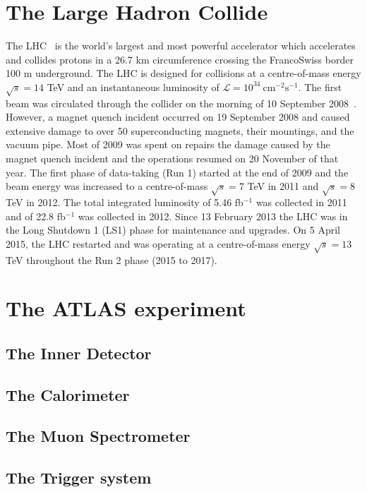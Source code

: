 \section{The Large Hadron Collide}
The LHC~\cite{1748-0221-3-08-S08001} is the world's largest and most powerful accelerator which accelerates and collides protons in a 26.7 km circumference crossing the Franco\textendash Swiss border 100 m underground.
The LHC is designed for collisions at a centre-of-mass energy $\sqrt{s}=14$ TeV and an instantaneous luminosity of $\mathcal{L} =10^{34} \ \textrm{cm}^{-2}\textrm{s}^{-1}$.
The first beam was circulated through the collider on the morning of 10 September 2008~\cite{CERN-COURIER-Sep192008}.
However, a magnet quench incident occurred on 19 September 2008 and caused extensive damage to over 50 superconducting magnets, their mountings, and the vacuum pipe.
Most of 2009 was spent on repairs the damage caused by the magnet quench incident and the operations resumed on 20 November of that year.
The first phase of data-taking (Run 1) started at the end of 2009 and the beam energy was increased to a centre-of-mass $\sqrt{s}=7$ TeV in 2011 and $\sqrt{s} = 8$ TeV in 2012.
The total integrated luminosity of 5.46 fb$^{-1}$ was collected in 2011 and of 22.8 fb$^{-1}$ was collected in 2012.
Since 13 February 2013 the LHC was in the Long Shutdown 1 (LS1) phase for maintenance and upgrades.
On 5 April 2015, the LHC restarted and was operating at a centre-of-mass energy $\sqrt{s}=13$ TeV throughout the Run 2 phase (2015 to 2017).



\section{The ATLAS experiment}

\subsection{The Inner Detector}

\subsection{The Calorimeter}

\subsection{The Muon Spectrometer}

\subsection{The Trigger system}

\subsection{}